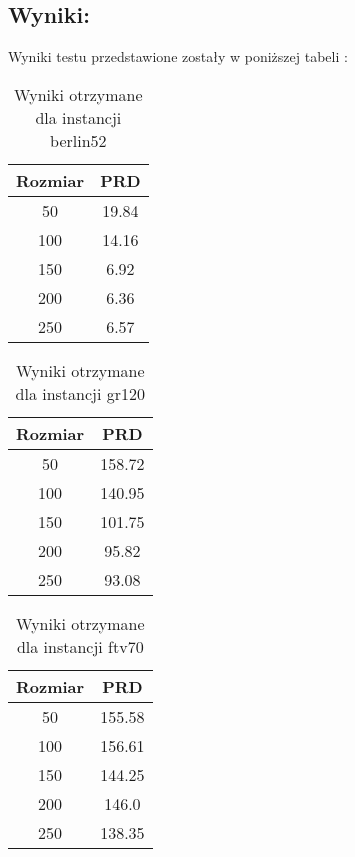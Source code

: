   \subsection{Wyniki: }
    Wyniki testu przedstawione zostały w poniższej tabeli :
    \begin{table}[!ht]
        \centering
        \begin{tabular}{|c | c |}
        \hline
            Rozmiar & PRD \\ \hline
            50 & 19.84\\ \hline
            100 & 14.16\\ \hline
            150 & 6.92\\ \hline
            200 & 6.36 \\ \hline
            250 & 6.57\\ \hline
        \end{tabular}
        \caption{Wyniki otrzymane dla instancji berlin52}
    
      \end{table}
      \begin{table}[!ht]
        \centering
        \begin{tabular}{| c | c |}
        \hline
            Rozmiar & PRD \\ \hline
            50 & 158.72\\ \hline
            100 & 140.95\\ \hline
            150 & 101.75\\ \hline
            200 & 95.82\\ \hline
            250 & 93.08\\ \hline
            
        \end{tabular}
        \caption{Wyniki otrzymane dla instancji gr120}
    
      \end{table}
      \begin{table}[!ht]
        \centering
        \begin{tabular}{|c | c |}
        \hline
            Rozmiar & PRD \\ \hline
            50 & 155.58\\ \hline
            100 & 156.61\\ \hline
            150 & 144.25\\ \hline
            200 & 146.0\\ \hline
            250 & 138.35\\  \hline
        \end{tabular}
        \caption{Wyniki otrzymane dla instancji ftv70}
      \end{table}
